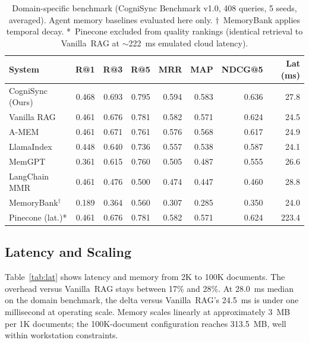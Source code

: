 \documentclass[sigconf,authordraft]{acmart}
\begin{document}
\begin{table}[t]
\caption{%
  Domain-specific benchmark (CogniSync Benchmark v1.0, 408 queries,
  5 seeds, averaged). Agent memory baselines evaluated here only.
  $\dagger$~MemoryBank applies temporal decay.
  *~Pinecone excluded from quality rankings (identical retrieval to
  Vanilla~RAG at $\sim$222~ms emulated cloud latency).%
}
\label{tab:main}
\begin{tabular}{lrrrrrrr}
\toprule
\textbf{System} &
  \textbf{R@1} & \textbf{R@3} & \textbf{R@5} &
  \textbf{MRR} & \textbf{MAP} & \textbf{NDCG@5} &
  \textbf{Lat (ms)} \\
\midrule
CogniSync (Ours)      & 0.468 & 0.693 & 0.795 & 0.594 & 0.583 & 0.636 & 27.8 \\
Vanilla RAG           & 0.461 & 0.676 & 0.781 & 0.582 & 0.571 & 0.624 & 24.5 \\
A-MEM                 & 0.461 & 0.671 & 0.761 & 0.576 & 0.568 & 0.617 & 24.9 \\
LlamaIndex            & 0.448 & 0.640 & 0.736 & 0.557 & 0.538 & 0.587 & 24.1 \\
MemGPT                & 0.361 & 0.615 & 0.760 & 0.505 & 0.487 & 0.555 & 26.6 \\
LangChain MMR         & 0.461 & 0.476 & 0.500 & 0.474 & 0.447 & 0.460 & 28.8 \\
MemoryBank$^\dagger$ & 0.189 & 0.364 & 0.560 & 0.307 & 0.285 & 0.350 & 24.0 \\
Pinecone (lat.)*      & 0.461 & 0.676 & 0.781 & 0.582 & 0.571 & 0.624 & 223.4 \\
\bottomrule
\end{tabular}
\end{table}

\subsection{Latency and Scaling}

Table~\ref{tab:lat} shows latency and memory from 2K to 100K documents.
The overhead versus Vanilla~RAG stays between 17\% and 28\%. At 28.0~ms
median on the domain benchmark, the delta versus Vanilla~RAG's 24.5~ms
is under one millisecond at operating scale. Memory scales linearly at
approximately 3~MB per 1K documents; the 100K-document configuration
reaches 313.5~MB, well within workstation constraints.
\end{document}
